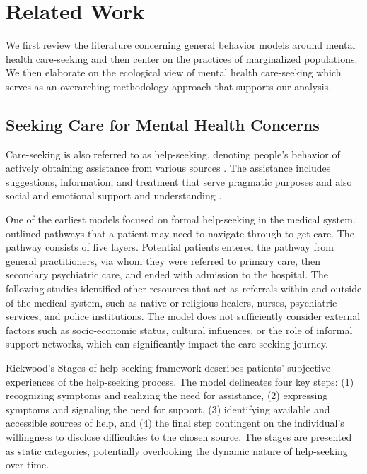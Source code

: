 \section{Related Work}
We first review the literature concerning general behavior models around mental health care-seeking and then center on the practices of marginalized populations. We then elaborate on the ecological view of mental health care-seeking which serves as an overarching methodology approach that supports our analysis. 

\subsection{Seeking Care for Mental Health Concerns} 
Care-seeking is also referred to as help-seeking, denoting people's behavior of actively obtaining assistance from various sources \cite{rickwood_conceptual_2012}. The assistance includes suggestions, information, and treatment that serve pragmatic purposes and also social and emotional support and understanding \cite{lachmar_mydepressionlookslike_2017}. 

One of the earliest models focused on formal help-seeking in the medical system. \textcite{huxley_mental_1996} outlined pathways that a patient may need to navigate through to get care. The pathway consists of five layers. Potential patients entered the pathway from general practitioners, via whom they were referred to primary care, then secondary psychiatric care, and ended with admission to the hospital. The following studies identified other resources that act as referrals within \cite{gater_pathways_1991} and outside \cite{bhui_mental_2002} of the medical system, such as native or religious healers, nurses, psychiatric services, and police institutions.
The model does not sufficiently consider external factors such as socio-economic status, cultural influences, or the role of informal support networks, which can significantly impact the care-seeking journey. 

Rickwood’s Stages of help-seeking framework \cite{rickwood_young_2005} describes patients' subjective experiences of the help-seeking process. The model delineates four key steps: (1) recognizing symptoms and realizing the need for assistance, (2) expressing symptoms and signaling the need for support, (3) identifying available and accessible sources of help, and (4) the final step contingent on the individual's willingness to disclose difficulties to the chosen source. The stages are presented as static categories, potentially overlooking the dynamic nature of help-seeking over time. 

